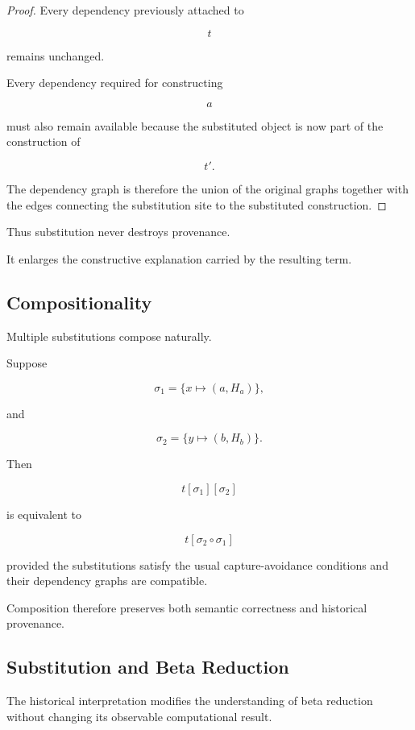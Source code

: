 \documentclass[12pt,oneside]{article}
\theoremstyle{definition}
\theoremstyle{remark}
\begin{document}
\begin{proof}

Every dependency previously attached to

\[
t
\]

remains unchanged.

Every dependency required for constructing

\[
a
\]

must also remain available because the substituted object is now part of the
construction of

\[
t'.
\]

The dependency graph is therefore the union of the original graphs together
with the edges connecting the substitution site to the substituted
construction.

\end{proof}

Thus substitution never destroys provenance.

It enlarges the constructive explanation carried by the resulting term.

\subsection{Compositionality}

Multiple substitutions compose naturally.

Suppose

\[
\sigma_1
=
\{
x\mapsto(a,H_a)
\},
\]

and

\[
\sigma_2
=
\{
y\mapsto(b,H_b)
\}.
\]

Then

\[
t[\sigma_1][\sigma_2]
\]

is equivalent to

\[
t[\sigma_2\circ\sigma_1]
\]

provided the substitutions satisfy the usual capture-avoidance conditions and
their dependency graphs are compatible.

Composition therefore preserves both semantic correctness and historical
provenance.

\subsection{Substitution and Beta Reduction}

The historical interpretation modifies the understanding of beta reduction
without changing its observable computational result.
\end{document}
